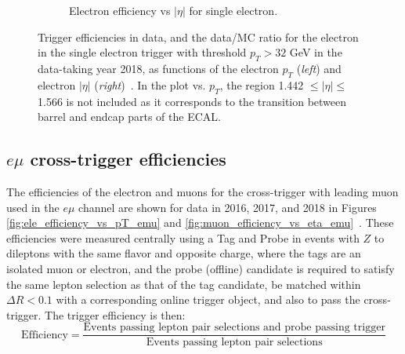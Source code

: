\begin{figure}[ht]
\begin{subfigure}{0.45\textwidth}
        \caption{Electron efficiency vs $|\eta|$ for single electron.}
        \label{fig:single_ele_32GeV_efficiency_vs_eta}
    \end{subfigure}
    \caption[Trigger efficiencies in data and the data/MC ratio for the electron in the single electron trigger with threshold $p_{T} > 32$ GeV in the data-taking year 2018, as functions of the electron $p_{T}$ (\textit{left}) and electron $|\eta|$ (\textit{right}).]{Trigger efficiencies in data, and the data/MC ratio for the electron in the single electron trigger with threshold $p_{T} > 32$ GeV in the data-taking year 2018, as functions of the electron $p_{T}$ (\textit{left}) and electron $|\eta|$ (\textit{right})~\cite{CMS-DP-2020-016}. In the plot vs. $p_{T}$, the region 1.442 $\leq |\eta| \leq$ 1.566 is not included as it corresponds to the transition between barrel and endcap parts of the ECAL.} 
\end{figure}


\subsection{\texorpdfstring{$e\mu$}{emu} cross-trigger efficiencies}

The efficiencies of the electron and muons for the cross-trigger with leading muon used in the $e\mu$ channel are shown for data in 2016, 2017, and 2018 in Figures \ref{fig:ele_efficiency_vs_pT_emu} and \ref{fig:muon_efficiency_vs_eta_emu}~\cite{CMS-DP-2019-025}. These efficiencies were measured centrally using a Tag and Probe in events with $Z$ to dileptons with the same flavor and opposite charge, where the tags are an isolated muon or electron, and the probe (offline) candidate is required to satisfy the same lepton selection as that of the tag candidate, be matched within $\Delta R < 0.1$ with a corresponding online trigger object, and also to pass the cross-trigger. The trigger efficiency is then:
\begin{equation}
    \text{Efficiency} = \frac{\text{Events passing lepton pair selections and probe passing trigger}}{\text{Events passing lepton pair selections}}
\end{equation}

